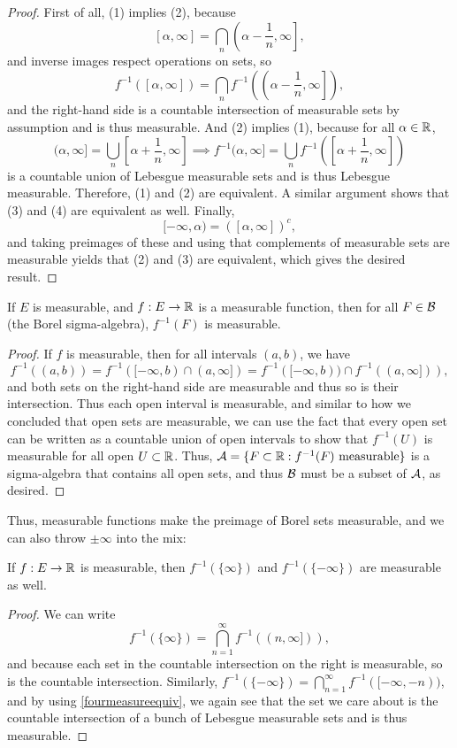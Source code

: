 \begin{proof}
First of all, (1) implies (2), because
\[
    [\alpha, \infty] = \bigcap_n \left(\alpha - \frac{1}{n}, \infty\right],
\]
and inverse images respect operations on sets, so 
\[
    f^{-1}([\alpha, \infty]) = \bigcap_n f^{-1}\left(\left(\alpha - \frac{1}{n}, \infty\right]\right),
\]
and the right-hand side is a countable intersection of measurable sets by assumption and is thus measurable. And (2) implies (1), because for all $\alpha \in \mathbb R$, 
\[
    (\alpha, \infty] = \bigcup_n \left[\alpha + \frac{1}{n}, \infty\right] \implies f^{-1}(\alpha, \infty] = \bigcup_n f^{-1}\left(\left[\alpha + \frac{1}{n}, \infty\right]\right)
\]
is a countable union of Lebesgue measurable sets and is thus Lebesgue measurable. Therefore, (1) and (2) are equivalent. A similar argument shows that (3) and (4) are equivalent as well. Finally,
\[
    [-\infty, \alpha) = ([\alpha, \infty])^c,
\]
and taking preimages of these and using that complements of measurable sets are measurable yields that (2) and (3) are equivalent, which gives the desired result.
\end{proof}

\begin{theorem}
If $E$ is measurable, and $f: E \to \mathbb R$ is a measurable function, then for all $F \in \mathcal{B}$ (the Borel sigma-algebra), $f^{-1}(F)$ is measurable.
\end{theorem}
\begin{proof}
If $f$ is measurable, then for all intervals $(a, b)$, we have 
\[
    f^{-1}((a, b)) = f^{-1}([-\infty, b) \cap (a, \infty]) = f^{-1}([-\infty, b)) \cap f^{-1}((a, \infty])),
\]
and both sets on the right-hand side are measurable and thus so is their intersection. Thus each open interval is measurable, and similar to how we concluded that open sets are measurable, we can use the fact that every open set can be written as a countable union of open intervals to show that $f^{-1}(U)$ is measurable for all open $U \subset \mathbb R$. Thus, $\mathcal{A} = \{F \subset \mathbb R: f^{-1}(F) \text{ measurable}\}$ is a sigma-algebra that contains all open sets, and thus $\mathcal{B}$ must be a subset of $\mathcal{A}$, as desired.
\end{proof}

Thus, measurable functions make the preimage of Borel sets measurable, and we can also throw $\pm \infty$ into the mix:

\begin{theorem}
If $f: E \to \mathbb R$ is measurable, then $f^{-1}(\{\infty\})$ and $f^{-1}(\{-\infty\})$ are measurable as well. 
\end{theorem}
\begin{proof}
We can write
\[
    f^{-1}(\{\infty\}) = \bigcap_{n=1}^{\infty} f^{-1}((n, \infty])),
\]
and because each set in the countable intersection on the right is measurable, so is the countable intersection. Similarly, $f^{-1}(\{-\infty\}) = \bigcap_{n=1}^{\infty} f^{-1}([-\infty, -n))$, and by using \cref{fourmeasureequiv}, we again see that the set we care about is the countable intersection of a bunch of Lebesgue measurable sets and is thus measurable. 
\end{proof}

